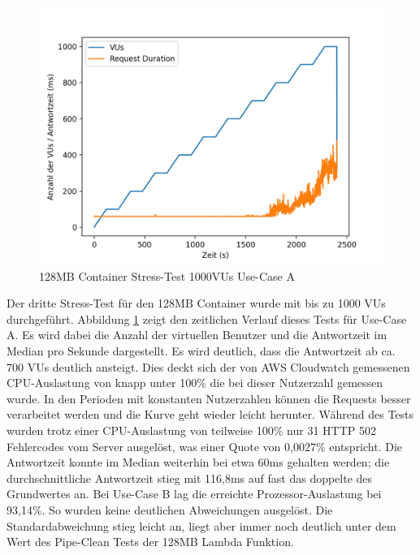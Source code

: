 \begin{figure}[H]
    \includegraphics[width=\textwidth]{img/fargate128-stress1000.png}
    \caption[Container Stress-Test 1000VUs]{128MB Container Stress-Test 1000VUs Use-Case A}
    \label{fig:fargate128-stress1000}
\end{figure}

Der dritte Stress-Test für den 128MB Container wurde mit bis zu 1000 VUs durchgeführt. Abbildung \ref{fig:fargate128-stress1000} zeigt den zeitlichen Verlauf dieses Tests für Use-Case A. Es wird dabei die Anzahl der virtuellen Benutzer und die Antwortzeit im Median pro Sekunde dargestellt. Es wird deutlich, dass die Antwortzeit ab ca. 700 VUs deutlich ansteigt. Dies deckt sich der von AWS Cloudwatch gemessenen CPU-Auslastung von knapp unter 100\% die bei dieser Nutzerzahl gemessen wurde. In den Perioden mit konstanten Nutzerzahlen können die Requests besser verarbeitet werden und die Kurve geht wieder leicht herunter. Während des Tests wurden trotz einer CPU-Auslastung von teilweise 100\% nur 31 HTTP 502 Fehlercodes vom Server ausgelöst, was einer Quote von 0,0027\% entspricht. Die Antwortzeit konnte im Median weiterhin bei etwa 60ms gehalten werden; die durchschnittliche Antwortzeit stieg mit 116,8ms auf fast das doppelte des Grundwertes an.  
Bei Use-Case B lag die erreichte Prozessor-Auslastung bei 93,14\%. So wurden keine deutlichen Abweichungen ausgelöst. Die Standardabweichung stieg leicht an, liegt aber immer noch deutlich unter dem Wert des Pipe-Clean Tests der 128MB Lambda Funktion.

